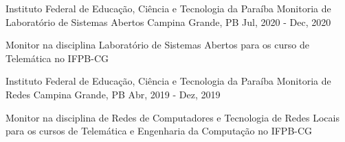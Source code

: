\begin{cventries}
  \cventry
  {Instituto Federal de Educação, Ciência e Tecnologia da Paraíba}
  {Monitoria de Laboratório de Sistemas Abertos}
  {Campina Grande, PB}
  {Jul, 2020 - Dec, 2020}
  {
    \begin{cvitems}
      \item {Monitor na disciplina Laboratório de Sistemas Abertos para os curso de Telemática no IFPB-CG}
    \end{cvitems}
  }

  \cventry
  {Instituto Federal de Educação, Ciência e Tecnologia da Paraíba}
  {Monitoria de Redes}
  {Campina Grande, PB}
  {Abr, 2019 - Dez, 2019}
  {
    \begin{cvitems}
      \item {Monitor na disciplina de Redes de Computadores e Tecnologia de Redes Locais para os cursos de Telemática e Engenharia da Computação no IFPB-CG}
    \end{cvitems}
  }

\end{cventries}
